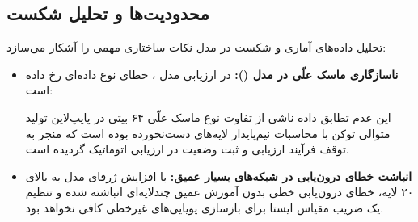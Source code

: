 \subsection{محدودیت‌ها و تحلیل شکست}
تحلیل داده‌های آماری و شکست در مدل  نکات ساختاری مهمی را آشکار می‌سازد:
\begin{itemize}
    \item \textbf{ناسازگاری ماسک علّی در مدل  ():} در ارزیابی مدل ، خطای نوع داده‌ای رخ داده است:
    \begin{quote}
    \end{quote}
    این عدم تطابق داده ناشی از تفاوت نوع ماسک علّی ۶۴ بیتی در پایپ‌لاین تولید متوالی توکن با محاسبات نیم‌پایدار  لایه‌های دست‌نخورده بوده است که منجر به توقف فرآیند ارزیابی و ثبت وضعیت  در ارزیابی اتوماتیک گردیده است.
    \item \textbf{انباشت خطای درون‌یابی در شبکه‌های بسیار عمیق:} با افزایش ژرفای مدل به بالای ۲۰ لایه، خطای درون‌یابی خطی بدون آموزش عمیق چندلایه‌ای انباشته شده و تنظیم یک ضریب مقیاس ایستا برای بازسازی پویایی‌های غیرخطی کافی نخواهد بود.
\end{itemize}

